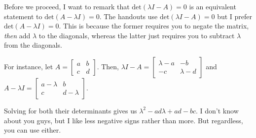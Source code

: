 \documentclass{article}
\begin{document}
Before we proceed, I want to remark that \(\text{det}(\lambda I - A) = 0 \) is an equivalent statement to \(\text{det}(A - \lambda I) =0\). The handouts use \(\text{det}(\lambda I - A) = 0 \)
but I prefer \(\text{det}(A - \lambda I) =0\). This is because the former requires you to negate the matrix, \textit{then} add \(\lambda\) to the diagonals, whereas
the latter just requires you to subtract \(\lambda\) from the diagonals.\par 
For instance, let \(A=\begin{bmatrix}
    a&b \\ c&d
\end{bmatrix}\). Then, \(
    \lambda I - A = \begin{bmatrix}
        \lambda - a & - b \\ - c & \lambda - d
    \end{bmatrix}\) and \( A - \lambda I = \begin{bmatrix}
        a - \lambda & b \\ c & d - \lambda
    \end{bmatrix} 
\).\par 
Solving for both their determinants gives us \(\lambda^2 - ad\lambda + ad -bc\). 
I don't know about you guys, but I like less negative signs rather than more. But regardless, you can use either. 
\end{document}
